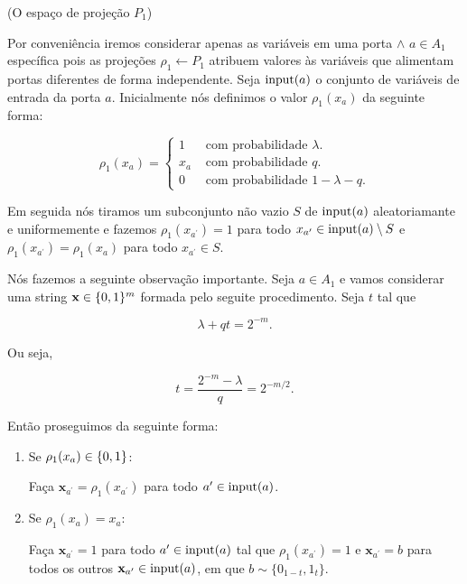\begin{defi} (O espaço de projeção $P_{1}$) \label{defi_P1}

Por conveniência iremos considerar apenas as variáveis em uma porta $\land$ $a \in A_{1}$ específica pois as projeções $\rho_{1} \leftarrow P_{1}$ atribuem valores às variáveis que alimentam portas diferentes de forma independente. Seja $\text{input}(a)$ o conjunto de variáveis de entrada da porta $a$. Inicialmente nós definimos o valor $\rho_{1}(x_{a})$ da seguinte forma:

\begin{equation} \label{defi_P1_eqn}
	\rho_{1}(x_{a}) = \begin{cases}
				1 & \text{ com probabilidade } \lambda. \\
				x_{a} & \text{ com probabilidade } q. \\
				0 & \text{ com probabilidade } 1 - \lambda - q.
			  \end{cases}
\end{equation}

Em seguida nós tiramos um subconjunto não vazio $S$ de $\text{input}(a)$ aleatoriamante e uniformemente e fazemos $\rho_{1}(x_{a^{\prime}}) = 1$ para todo $x_{a^{\prime}} \in \text{input}(a) \setminus S$ e $\rho_{1}(x_{a^{\prime}}) = \rho_{1}(x_{a})$ para todo $x_{a^{\prime}} \in S$.

\end{defi}

Nós fazemos a seguinte observação importante. Seja $a \in A_{1}$ e vamos considerar uma string $\textbf{x} \in \{0, 1\}^{m}$ formada pelo seguite procedimento. Seja $t$ tal que

\begin{equation} \label{t_defi_1}
	\lambda + qt = 2^{-m}.
\end{equation}

Ou seja,

\begin{equation} \label{t_defi_2}
	t = \frac{2^{-m} - \lambda}{q} = 2^{-m/2}.
\end{equation}

Então proseguimos da seguinte forma:

\begin{enumerate}

\item Se $\rho_{1}(x_{a}) \in \{0, 1\}$:

Faça $\textbf{x}_{a^{\prime}} = \rho_{1}(x_{a^{\prime}})$ para todo $a^{\prime} \in \text{input}(a)$.

\item Se $\rho_{1}(x_{a}) = x_{a}$:

Faça $\textbf{x}_{a^{\prime}} = 1$ para todo $a^{\prime} \in \text{input}(a)$ tal que $\rho_{1}(x_{a^{\prime}}) = 1$ e $\textbf{x}_{a^{\prime}} = b$ para todos os outros $\textbf{x}_{a^{\prime}} \in \text{input}(a)$, em que $b \sim \{0_{1 - t}, 1_{t}\}$.

\end{enumerate}

